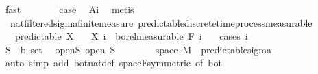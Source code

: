 \begin{isabellebody}
\ fast\isanewline
\ \ \ \ \isamarkupfalse%
\ \isamarkupfalse%
\ {\isacharquery}{\kern0pt}case\ \isamarkupfalse%
\ A{\isacharunderscore}{\kern0pt}i\ \isamarkupfalse%
\ metis\isanewline
\ \ \isacommand{{\isacharbraceright}{\kern0pt}}\isamarkupfalse%
\isanewline
{}\isamarkupfalse%
%
\endisatagproof
{\isafoldproof}%
%
\isadelimproof
\isanewline
%
\endisadelimproof
\isanewline
{}\isamarkupfalse%
\ {\isacharparenleft}{\kern0pt}\ nat{\isacharunderscore}{\kern0pt}filtered{\isacharunderscore}{\kern0pt}sigma{\isacharunderscore}{\kern0pt}finite{\isacharunderscore}{\kern0pt}measure{\isacharparenright}{\kern0pt}\ predictable{\isacharunderscore}{\kern0pt}discrete{\isacharunderscore}{\kern0pt}time{\isacharunderscore}{\kern0pt}process{\isacharunderscore}{\kern0pt}measurable{\isacharcolon}{\kern0pt}\isanewline
\ \ \ {\isachardoublequoteopen}predictable\ X{\isachardoublequoteclose}\isanewline
\ \ \ {\isachardoublequoteopen}X\ i\ {\isasymin}\ borel{\isacharunderscore}{\kern0pt}measurable\ {\isacharparenleft}{\kern0pt}F\ {\isacharparenleft}{\kern0pt}i\ {\isacharminus}{\kern0pt}\ {}{\isacharparenright}{\kern0pt}{\isacharparenright}{\kern0pt}{\isachardoublequoteclose}\isanewline
%
\isadelimproof
%
\endisadelimproof
%
\isatagproof
{}\isamarkupfalse%
\ {\isacharparenleft}{\kern0pt}cases\ i{\isacharparenright}{\kern0pt}\isanewline
\ \ \isamarkupfalse%
\ {}\isanewline
\ \ \isacommand{{\isacharbraceleft}{\kern0pt}}\isamarkupfalse%
\isanewline
\ \ \ \ \isamarkupfalse%
\ S\ {\isacharcolon}{\kern0pt}{\isacharcolon}{\kern0pt}\ {\isachardoublequoteopen}{\isacharprime}{\kern0pt}b\ set{\isachardoublequoteclose}\ \isamarkupfalse%
\ open{\isacharunderscore}{\kern0pt}S{\isacharcolon}{\kern0pt}\ {\isachardoublequoteopen}open\ S{\isachardoublequoteclose}\isanewline
\ \ \ \ \isamarkupfalse%
\ {\isachardoublequoteopen}{\isacharbraceleft}{\kern0pt}{}{\isacharbraceright}{\kern0pt}\ {\isasymtimes}\ space\ M\ {\isasymin}\ predictable{\isacharunderscore}{\kern0pt}sigma{\isachardoublequoteclose}\ \isamarkupfalse%
\ {\isacharparenleft}{\kern0pt}auto\ simp\ add{\isacharcolon}{\kern0pt}\ bot{\isacharunderscore}{\kern0pt}nat{\isacharunderscore}{\kern0pt}def\ space{\isacharunderscore}{\kern0pt}F{\isacharbrackleft}{\kern0pt}symmetric{\isacharcomma}{\kern0pt}\ of\ bot{\isacharbrackright}{\kern0pt}{\isacharparenright}{\kern0pt}\isanewline

\end{isabellebody}
